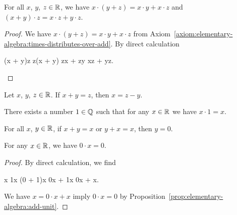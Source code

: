 \begin{theorem}\label{thm:elementary-algebra:times-distributes-over-add}
For all $x$, $y$, $z\in\mathbb{R}$, we have $x\cdot(y + z) = x\cdot y + x\cdot z$
and $(x + y)\cdot z = x\cdot z + y\cdot z$.
\end{theorem}

\begin{proof}
We have $x\cdot(y + z) = x\cdot y + x\cdot z$ from Axiom~\ref{axiom:elementary-algebra:times-distributes-over-add}.
By direct calculation
\begin{calculation}
(x + y)\cdot z
z\cdot(x + y)
z\cdot x + z\cdot y
x\cdot z + y\cdot z.\qedhere
\end{calculation}
\end{proof}

\begin{proposition}\label{prop:elementary-algebra:sub-from-both-sides}
Let $x$, $y$, $z\in\mathbb{R}$. If $x + y = z$, then $x = z - y$.
\end{proposition}

\begin{axiom}[Existence of $1$]\label{axiom:elementary-algebra:times-1}
There exists a number $1\in\mathbb{Q}$ such that for any $x\in\mathbb{R}$ we have $x\cdot1=x$.
\end{axiom}

\begin{proposition}\label{prop:elementary-algebra:add-unit}
For all $x$, $y\in\mathbb{R}$, if $x + y = x$ or $y + x = x$, then $y = 0$.
\end{proposition}

\begin{theorem}\label{thm:elementary-algebra:0-times-anything-is-0}
For any $x\in\mathbb{R}$, we have $0\cdot x=0$.
\end{theorem}
\begin{proof}
By direct calculation, we find
\begin{calculation}
  x
  1\cdot x
  (0 + 1)\cdot x
  0\cdot x + 1\cdot x
  0\cdot x + x.
\end{calculation}
We have $x = 0\cdot x + x$ imply $0\cdot x = 0$ by Proposition~\ref{prop:elementary-algebra:add-unit}.
\end{proof}

